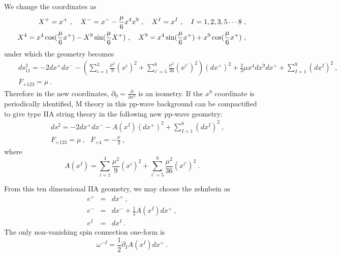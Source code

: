 \documentclass[a4paper,12pt]{article}
\begin{document}
We change the coordinates as 
\begin{eqnarray}
X^+= x^+~, \ \ \ X^- = x^- - \frac{\mu}{6}x^4 x^9~, \ \ \ X^I = x^I~,
\ \ \ I= 1, 2, 3, 5 \cdots 8~, \cr 
X^4 = x^4 \cos ( \frac{\mu}{6}x^+)
- X^9 \sin ( \frac{\mu}{6}X^+)~, \ \ \ 
X^9 = x^4 \sin (\frac{\mu}{6}x^+) + x^9 \cos ( \frac{\mu}{6}x^+)~,
\end{eqnarray}
under which the geometry becomes
\begin{eqnarray}
& & ds_{11}^2 = - 2 dx^+ dx^-
    - \left( \sum^3_{i=1} \frac{\mu^2}{9} (x^i)^2
            +\sum^8_{i'=5} \frac{\mu^2}{36} (x^{i'})^2
      \right) (dx^+)^2 + \frac{2}{3}\mu x^4 dx^9dx^+
    + \sum^9_{I=1} (dx^I)^2~,
                                      \nonumber \\
& & F_{+123} = \mu~.
\label{pp-wave-2}
\end{eqnarray}
Therefore in the new coordinates, $\partial_9=\frac{\partial}{\partial
x^9}$ is an isometry.  If the $x^9$ coordinate is periodically
identified, M theory in this pp-wave background can be compactified to
give type IIA string theory in the following new pp-wave geometry:
\begin{eqnarray}
& & ds^2 = - 2 dx^+ dx^-
    - A(x^I) (dx^+)^2  + \sum^8_{I=1} (dx^I)^2~,
                                      \nonumber \\
& & F_{+123} = \mu~,\ \ \  F_{+4} = -\frac{\mu}{3} ~,
\end{eqnarray}
where
\begin{equation}
A(x^I) = \sum^4_{i=1} \frac{\mu^2}{9} (x^i)^2
            +\sum^8_{i'=5} \frac{\mu^2}{36} (x^{i'})^2 ~.
\end{equation}

From this ten dimensional IIA geometry, we may choose the zehnbein as
\begin{eqnarray}
e^+ &=& dx^+ ~, \nonumber \\
e^- &=& dx^- + \frac{1}{2} A(x^I) dx^+ ~, \nonumber \\
e^I &=& dx^I~.
\end{eqnarray}
The only non-vanishing spin connection one-form is 
\begin{equation}
\omega^{-I}= \frac{1}{2}\partial_I A(x^I) dx^+ ~.
\end{equation}
\end{document}
